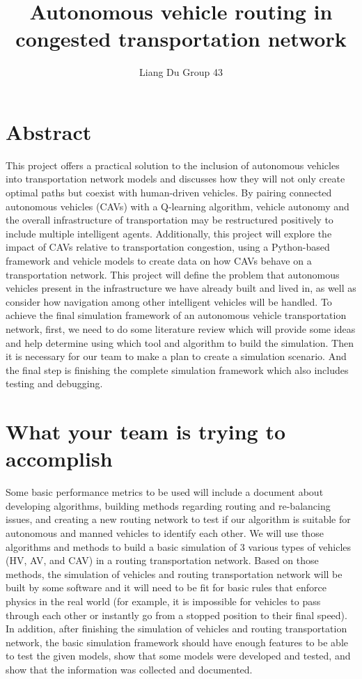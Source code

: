 \documentclass[draftclsnofoot,onecolumn]{IEEEtran}
\title{Autonomous vehicle routing in congested transportation network}
\author{Liang Du Group 43}
\begin{document}
\maketitle

\section{Abstract}
This project offers a practical solution to the inclusion of autonomous vehicles into transportation network models and discusses how they will not only create optimal paths but coexist with human-driven vehicles. By pairing connected autonomous vehicles (CAVs) with a Q-learning algorithm, vehicle autonomy and the overall infrastructure of transportation may be restructured positively to include multiple intelligent agents. Additionally, this project will explore the impact of CAVs relative to transportation congestion, using a Python-based framework and vehicle models to create data on how CAVs behave on a transportation network. This project will define the problem that autonomous vehicles present in the infrastructure we have already built and lived in, as well as consider how navigation among other intelligent vehicles will be handled. To achieve the final simulation framework of an autonomous vehicle transportation network, first, we need to do some literature review which will provide some ideas and help determine using which tool and algorithm to build the simulation. Then it is necessary for our team to make a plan to create a simulation scenario. And the final step is finishing the complete simulation framework which also includes testing and debugging.

\pagebreak

\maketitle

\section{What your team is trying to accomplish}
Some basic performance metrics to be used will include a document about developing algorithms, building methods regarding routing and re-balancing issues, and creating a new routing network to test if our algorithm is suitable for autonomous and manned vehicles to identify each other. We will use those algorithms and methods to build a basic simulation of 3 various types of vehicles (HV, AV, and CAV) in a routing transportation network. Based on those methods, the simulation of vehicles and routing transportation network will be built by some software and it will need to be fit for basic rules that enforce physics in the real world (for example, it is impossible for vehicles to pass through each other or instantly go from a stopped position to their final speed). In addition, after finishing the simulation of vehicles and routing transportation network, the basic simulation framework should have enough features to be able to test the given models, show that some models were developed and tested, and show that the information was collected and documented.
\end{document}
